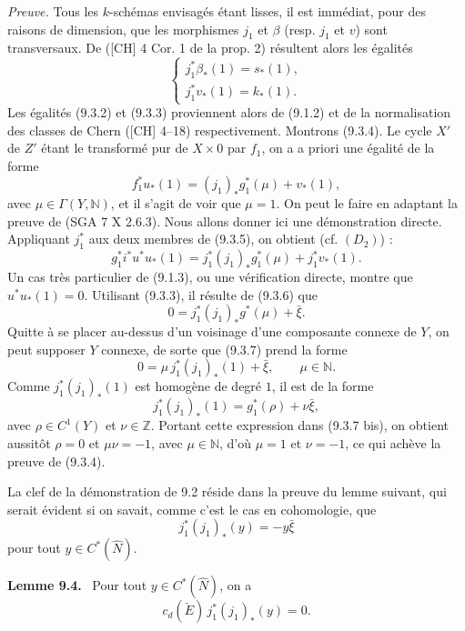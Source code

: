 \documentclass[11pt]{article}
\newenvironment{statement}[1]{\par\medskip\noindent\textbf{#1.}\ }{\par\medskip}
\begin{document}
\emph{Preuve.} Tous les $k$-schémas envisagés étant lisses, il est immédiat, pour des raisons de dimension, que les morphismes $j_1$ et $\beta$ (resp. $j_1$ et $v$) sont transversaux. De ([CH] 4 Cor. 1 de la prop. 2) résultent alors les égalités
\[
\begin{cases}
j_1^*\beta_*(1)=s_*(1),\\
j_1^*v_*(1)=k_*(1).
\end{cases}
\]
Les égalités (9.3.2) et (9.3.3) proviennent alors de (9.1.2) et de la normalisation des classes de Chern ([CH] 4--18) respectivement. Montrons (9.3.4). Le cycle $X'$ de $Z'$ étant le transformé pur de $X\times0$ par $f_1$, on a a priori une égalité de la forme
\[
f_1^*u_*(1)=(j_1)_*g_1^*(\mu)+v_*(1),
\tag{9.3.5}
\]
avec $\mu\in\Gamma(Y,\mathbb N)$, et il s'agit de voir que $\mu=1$. On peut le faire en adaptant la preuve de (SGA 7 X 2.6.3). Nous allons donner ici une démonstration directe. Appliquant $j_1^*$ aux deux membres de (9.3.5), on obtient (cf. $(D_2)$) :
\[
g_1^*i^*u^*u_*(1)=j_1^*(j_1)_*g_1^*(\mu)+j_1^*v_*(1).
\tag{9.3.6}
\]
Un cas très particulier de (9.1.3), ou une vérification directe, montre que $u^*u_*(1)=0$. Utilisant (9.3.3), il résulte de (9.3.6) que
\[
0=j_1^*(j_1)_*g^*(\mu)+\bar\xi.
\tag{9.3.7}
\]
Quitte à se placer au-dessus d'un voisinage d'une composante connexe de $Y$, on peut supposer $Y$ connexe, de sorte que (9.3.7) prend la forme
\[
0=\mu\,j_1^*(j_1)_*(1)+\bar\xi,\qquad \mu\in\mathbb N.
\tag{9.3.7 bis}
\]
Comme $j_1^*(j_1)_*(1)$ est homogène de degré $1$, il est de la forme
\[
j_1^*(j_1)_*(1)=g_1^*(\rho)+\nu\bar\xi,
\]
avec $\rho\in C^1(Y)$ et $\nu\in\mathbb Z$. Portant cette expression dans (9.3.7 bis), on obtient aussitôt $\rho=0$ et $\mu\nu=-1$, avec $\mu\in\mathbb N$, d'où $\mu=1$ et $\nu=-1$, ce qui achève la preuve de (9.3.4).

La clef de la démonstration de 9.2 réside dans la preuve du lemme suivant, qui serait évident si on savait, comme c'est le cas en cohomologie, que
\[
j_1^*(j_1)_*(y)=-y\bar\xi
\]
pour tout $y\in C^*(\widehat N)$.

\begin{statement}{Lemme 9.4}
Pour tout $y\in C^*(\widehat N)$, on a
\[
c_d(\check E)\,j_1^*(j_1)_*(y)=0.
\]
\end{statement}
\end{document}
